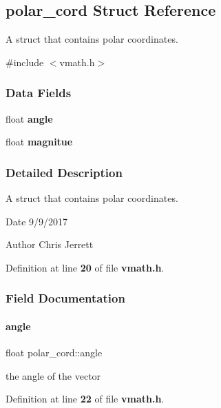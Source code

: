 \subsection{polar\+\_\+cord Struct Reference}
\label{structpolar__cord}


A struct that contains polar coordinates.  




{\ttfamily \#include $<$vmath.\+h$>$}

\subsubsection*{Data Fields}
\begin{DoxyCompactItemize}
\item 
float \textbf{ angle}
\item 
float \textbf{ magnitue}
\end{DoxyCompactItemize}


\subsubsection{Detailed Description}
A struct that contains polar coordinates. 

\begin{DoxyDate}{Date}
9/9/2017 
\end{DoxyDate}
\begin{DoxyAuthor}{Author}
Chris Jerrett 
\end{DoxyAuthor}


Definition at line \textbf{ 20} of file \textbf{ vmath.\+h}.



\subsubsection{Field Documentation}
\mbox{\label{structpolar__cord_a81b3a11d38d76719b02fcd425adaa216}} 
\paragraph{angle}
{\footnotesize\ttfamily float polar\+\_\+cord\+::angle}

the angle of the vector 

Definition at line \textbf{ 22} of file \textbf{ vmath.\+h}.



